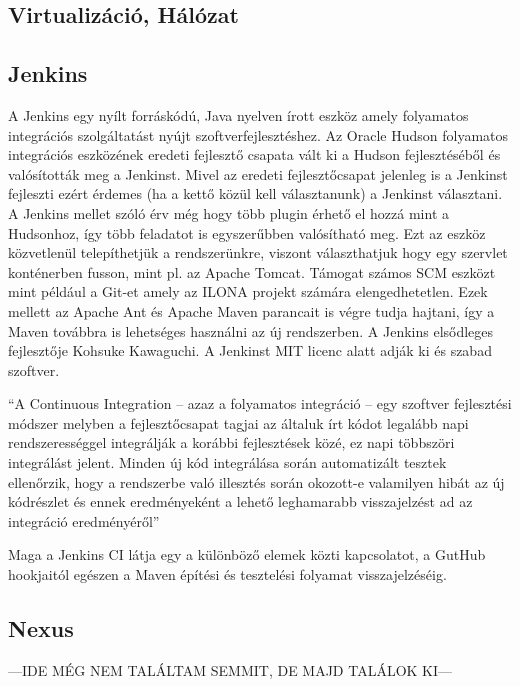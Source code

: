 \subsection{Virtualizáció, Hálózat}

\subsection{Jenkins}
A Jenkins egy nyílt forráskódú, Java nyelven írott eszköz amely folyamatos integrációs szolgáltatást nyújt szoftverfejlesztéshez. 
Az Oracle Hudson folyamatos integrációs eszközének eredeti fejlesztő csapata vált ki a Hudson fejlesztéséből és valósították meg a Jenkinst. 
Mivel az eredeti fejlesztőcsapat jelenleg is a Jenkinst fejleszti ezért érdemes (ha a kettő közül kell választanunk) a Jenkinst választani. 
A Jenkins mellet szóló érv még hogy több plugin érhető el hozzá mint a Hudsonhoz, így több feladatot is egyszerűbben valósítható meg. 
Ezt az eszköz közvetlenül telepíthetjük a rendszerünkre, viszont választhatjuk hogy egy szervlet konténerben fusson, mint pl. az Apache Tomcat. 
Támogat számos SCM eszközt mint például a Git-et amely az ILONA projekt számára elengedhetetlen. 
Ezek mellett az Apache Ant és Apache Maven parancait is végre tudja hajtani, így a Maven továbbra is lehetséges használni az új rendszerben. 
A Jenkins elsődleges fejlesztője Kohsuke Kawaguchi. A Jenkinst MIT licenc alatt adják ki és szabad szoftver. 

“A Continuous Integration – azaz a folyamatos integráció – egy szoftver fejlesztési módszer melyben a fejlesztőcsapat tagjai az általuk írt kódot legalább napi rendszerességgel integrálják a korábbi fejlesztések közé, ez napi többszöri integrálást jelent. Minden új kód integrálása során automatizált tesztek ellenőrzik, hogy a rendszerbe való illesztés során okozott-e valamilyen hibát az új kódrészlet és ennek eredményeként a lehető leghamarabb visszajelzést ad az integráció eredményéről”
\cite{fowler2006continuous}

Maga a Jenkins CI látja egy a különböző elemek közti kapcsolatot, a GutHub hookjaitól egészen a Maven építési és tesztelési folyamat visszajelzéséig. 

\subsection{Nexus}

---IDE MÉG NEM TALÁLTAM SEMMIT, DE MAJD TALÁLOK KI---

